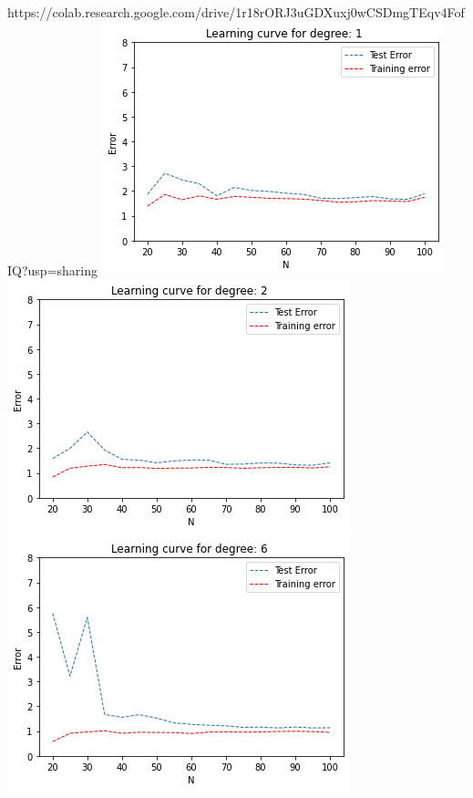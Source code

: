 \begin{solution}
\newline
https://colab.research.google.com/drive/1r18rORJ3uGDXuxj0wCSDmgTEqv4FofIQ?usp=sharing
\newline
\includegraphics[scale =.5]{set1/images/LCD1.png}\newline
\includegraphics[scale =.5]{set1/images/LCD2.png}\newline
\includegraphics[scale =.5]{set1/images/LCD6.png}\newline

\end{solution}
